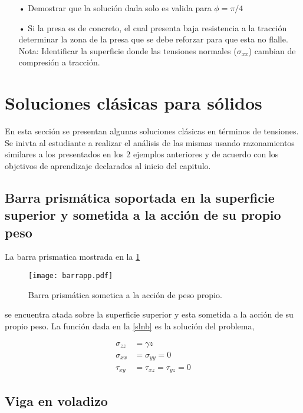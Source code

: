 \documentclass[../notas medios.tex]{subfiles}
\begin{document}
\begin{itemize}
\item[•] Demostrar que la solución dada solo es valida para $\phi = \pi/4$
\item[•] Si la presa es de concreto, el cual presenta baja resistencia a la tracción determinar la zona de la presa que se debe reforzar para que esta no flalle. Nota: Identificar la superficie donde las tensiones normales ($\sigma_{xx}$) cambian de compresión a tracción.
\end{itemize}

\section{Soluciones clásicas para sólidos}
En esta sección se presentan algunas soluciones clásicas en términos de tensiones. Se inivta al estudiante a realizar el análisis de las mismas usando razonamientos similares a los presentados en los 2 ejemplos anteriores y de acuerdo con los objetivos de aprendizaje declarados al inicio del capitulo.

\subsection{Barra prismática soportada en la superficie superior y sometida a la acción de su propio peso}

La barra prismatica mostrada en la \cref{barra}

\begin{figure}[H]
\centering
	\texttt{[image: barrapp.pdf]}
	\caption{Barra prismática sometica a la acción de peso propio.}
	\label{barra}
\end{figure}

se encuentra atada sobre la superficie superior y esta sometida a la acción de su propio peso. La función dada en la \cref{slnb} es la solución del problema,


\begin{equation}
\begin{split}
{\sigma _{zz}} & = \gamma z \\
{\sigma _{xx}} & = {\sigma _{yy}} = 0 \\
{\tau _{xy}}   & = {\tau _{xz}} = {\tau _{yz}} = 0
\end{split}
\label{slnb}
\end{equation}


\subsection{Viga en voladizo}
\end{document}
